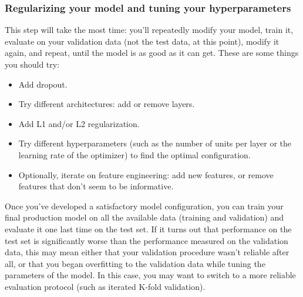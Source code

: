 \documentclass{article}
\numberwithin{equation}{section} %
\begin{document}
\subsubsection{Regularizing your model and tuning your hyperparameters}

This step will take the most time: you’ll repeatedly modify your model, train it, evaluate on your validation data (not the test data, at this point), modify it again, and repeat, until the model is as good as it can get. These are some things you should try:

\begin{itemize}
	\item Add dropout.
	\item Try different architectures: add or remove layers.
	\item Add L1 and/or L2 regularization.
	\item Try different hyperparameters (such as the number of units per layer or the learning rate of the optimizer) to find the optimal configuration.
	\item Optionally, iterate on feature engineering: add new features, or remove features that don’t seem to be informative.
\end{itemize}

Once you’ve developed a satisfactory model configuration, you can train your final
production model on all the available data (training and validation) and evaluate it
one last time on the test set. If it turns out that performance on the test set is significantly worse than the performance measured on the validation data, this may mean either that your validation procedure wasn’t reliable after all, or that you began overfitting to the validation data while tuning the parameters of the model. In this case, you may want to switch to a more reliable evaluation protocol (such as iterated K-fold validation).
\end{document}
